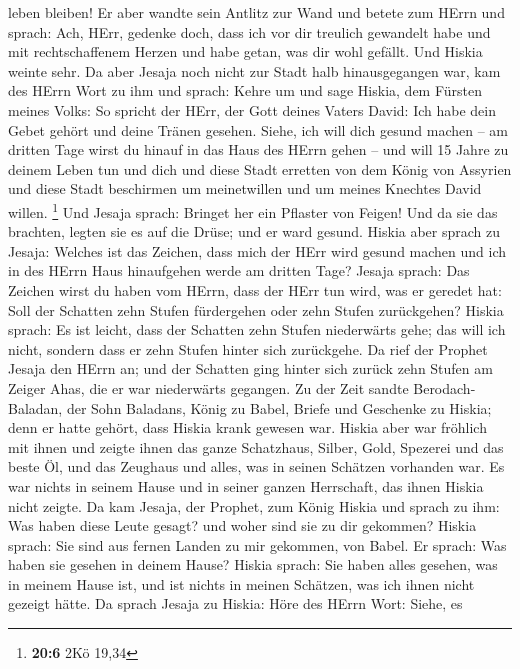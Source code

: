 leben bleiben!  Er aber wandte sein Antlitz zur Wand und
betete zum HErrn und sprach:  Ach, HErr, gedenke doch, dass
ich vor dir treulich gewandelt habe und mit rechtschaffenem Herzen und
habe getan, was dir wohl gefällt. Und Hiskia weinte sehr. 
Da aber Jesaja noch nicht zur Stadt halb hinausgegangen war, kam des
HErrn Wort zu ihm und sprach:  Kehre um und sage Hiskia, dem
Fürsten meines Volks: So spricht der HErr, der Gott deines Vaters David:
Ich habe dein Gebet gehört und deine Tränen gesehen. Siehe, ich will
dich gesund machen -- am dritten Tage wirst du hinauf in das Haus des
HErrn gehen --  und will 15 Jahre zu deinem Leben tun und
dich und diese Stadt erretten von dem König von Assyrien und diese Stadt
beschirmen um meinetwillen und um meines Knechtes David willen.
\footnote{\textbf{20:6} 2Kö 19,34}  Und Jesaja sprach:
Bringet her ein Pflaster von Feigen! Und da sie das brachten, legten sie
es auf die Drüse; und er ward gesund.  Hiskia aber sprach zu
Jesaja: Welches ist das Zeichen, dass mich der HErr wird gesund machen
und ich in des HErrn Haus hinaufgehen werde am dritten Tage?
 Jesaja sprach: Das Zeichen wirst du haben vom HErrn, dass
der HErr tun wird, was er geredet hat: Soll der Schatten zehn Stufen
fürdergehen oder zehn Stufen zurückgehen?  Hiskia sprach:
Es ist leicht, dass der Schatten zehn Stufen niederwärts gehe; das will
ich nicht, sondern dass er zehn Stufen hinter sich zurückgehe.
 Da rief der Prophet Jesaja den HErrn an; und der Schatten
ging hinter sich zurück zehn Stufen am Zeiger Ahas, die er war
niederwärts gegangen.  Zu der Zeit sandte Berodach-Baladan,
der Sohn Baladans, König zu Babel, Briefe und Geschenke zu Hiskia; denn
er hatte gehört, dass Hiskia krank gewesen war.  Hiskia
aber war fröhlich mit ihnen und zeigte ihnen das ganze Schatzhaus,
Silber, Gold, Spezerei und das beste Öl, und das Zeughaus und alles, was
in seinen Schätzen vorhanden war. Es war nichts in seinem Hause und in
seiner ganzen Herrschaft, das ihnen Hiskia nicht zeigte. 
Da kam Jesaja, der Prophet, zum König Hiskia und sprach zu ihm: Was
haben diese Leute gesagt? und woher sind sie zu dir gekommen? Hiskia
sprach: Sie sind aus fernen Landen zu mir gekommen, von Babel.
 Er sprach: Was haben sie gesehen in deinem Hause? Hiskia
sprach: Sie haben alles gesehen, was in meinem Hause ist, und ist nichts
in meinen Schätzen, was ich ihnen nicht gezeigt hätte.  Da
sprach Jesaja zu Hiskia: Höre des HErrn Wort:  Siehe, es
